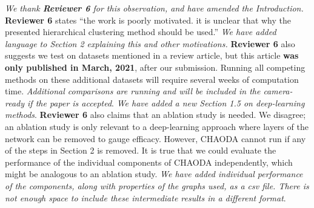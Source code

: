 \documentclass{article}
\begin{document}
\emph{We thank \textbf{Reviewer 6} for this observation, and have amended the Introduction.}
\textbf{Reviewer 6} states ``the work is poorly motivated. it is unclear that why the presented hierarchical clustering method should be used.''
\emph{We have added language to Section 2 explaining this and other motivations.}
\textbf{Reviewer 6} also suggests we test on datasets mentioned in a review article, but this article \textbf{was only published in March, 2021}, after our submission.
Running all competing methods on these additional datasets will require several weeks of computation time.
\emph{Additional comparisons are running and will be included in the camera-ready if the paper is accepted}.
\emph{We have added a new Section 1.5 on deep-learning methods}.
\textbf{Reviewer 6} also claims that an ablation study is needed.
We disagree; an ablation study is only relevant to a deep-learning approach where layers of the network can be removed to gauge efficacy.
However, CHAODA cannot run if any of the steps in Section 2 is removed.
It is true that we could evaluate the performance of the individual components of CHAODA independently, which might be analogous to an ablation study.
\emph{We have added individual performance of the components, along with properties of the graphs used, as a csv file. There is not enough space to include these intermediate results in a different format}.
\end{document}
